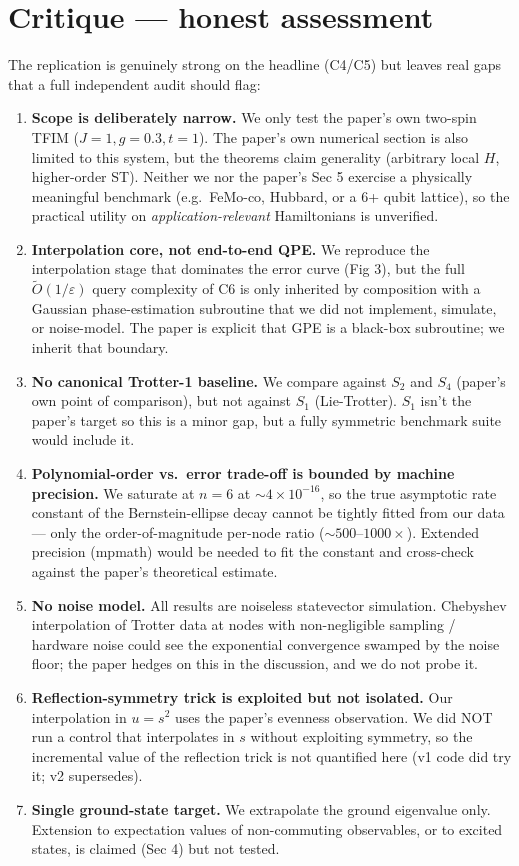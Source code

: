 \documentclass[11pt]{article}
\begin{document}
\section{Critique --- honest assessment}
The replication is genuinely strong on the headline (C4/C5) but leaves
real gaps that a full independent audit should flag:
\begin{enumerate}
  \item \textbf{Scope is deliberately narrow.} We only test the paper's
    own two-spin TFIM ($J=1, g=0.3, t=1$). The paper's own numerical
    section is also limited to this system, but the theorems claim
    generality (arbitrary local $H$, higher-order ST). Neither we nor
    the paper's Sec 5 exercise a physically meaningful benchmark
    (e.g.\ FeMo-co, Hubbard, or a 6+ qubit lattice), so the practical
    utility on \emph{application-relevant} Hamiltonians is unverified.
  \item \textbf{Interpolation core, not end-to-end QPE.} We reproduce
    the interpolation stage that dominates the error curve (Fig 3),
    but the full $\widetilde{O}(1/\varepsilon)$ query complexity of C6
    is only inherited by composition with a Gaussian phase-estimation
    subroutine that we did not implement, simulate, or noise-model.
    The paper is explicit that GPE is a black-box subroutine; we
    inherit that boundary.
  \item \textbf{No canonical Trotter-1 baseline.} We compare against
    $S_2$ and $S_4$ (paper's own point of comparison), but not
    against $S_1$ (Lie-Trotter). $S_1$ isn't the paper's target so
    this is a minor gap, but a fully symmetric benchmark suite would
    include it.
  \item \textbf{Polynomial-order vs.\ error trade-off is bounded by
    machine precision.} We saturate at $n=6$ at $\sim 4\times 10^{-16}$,
    so the true asymptotic rate constant of the Bernstein-ellipse
    decay cannot be tightly fitted from our data --- only the
    order-of-magnitude per-node ratio ($\sim\!500\text{--}1000\times$).
    Extended precision (mpmath) would be needed to fit the constant
    and cross-check against the paper's theoretical estimate.
  \item \textbf{No noise model.} All results are noiseless statevector
    simulation. Chebyshev interpolation of Trotter data at nodes with
    non-negligible sampling / hardware noise could see the
    exponential convergence swamped by the noise floor; the paper
    hedges on this in the discussion, and we do not probe it.
  \item \textbf{Reflection-symmetry trick is exploited but not
    isolated.} Our interpolation in $u = s^2$ uses the paper's
    evenness observation. We did NOT run a control that interpolates
    in $s$ without exploiting symmetry, so the incremental value of
    the reflection trick is not quantified here (v1 code did try it;
    v2 supersedes).
  \item \textbf{Single ground-state target.} We extrapolate the
    ground eigenvalue only. Extension to expectation values of
    non-commuting observables, or to excited states, is claimed
    (Sec 4) but not tested.
\end{enumerate}
\end{document}
